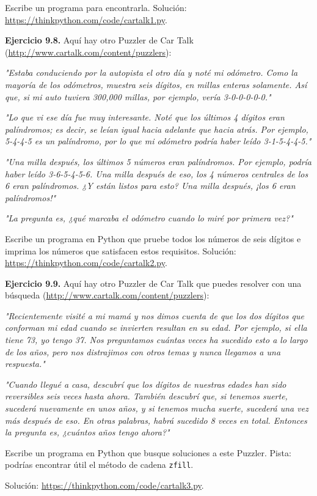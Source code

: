 Escribe un programa para encontrarla. Solución: \url{https://thinkpython.com/code/cartalk1.py}.

\textbf{Ejercicio 9.8.} Aquí hay otro Puzzler de Car Talk (\url{http://www.cartalk.com/content/puzzlers}):

\textit{"Estaba conduciendo por la autopista el otro día y noté mi odómetro. Como la mayoría de los odómetros, muestra seis dígitos, en millas enteras solamente. Así que, si mi auto tuviera 300,000 millas, por ejemplo, vería 3-0-0-0-0-0."}

\textit{"Lo que vi ese día fue muy interesante. Noté que los últimos 4 dígitos eran palíndromos; es decir, se leían igual hacia adelante que hacia atrás. Por ejemplo, 5-4-4-5 es un palíndromo, por lo que mi odómetro podría haber leído 3-1-5-4-4-5."}

\textit{"Una milla después, los últimos 5 números eran palíndromos. Por ejemplo, podría haber leído 3-6-5-4-5-6. Una milla después de eso, los 4 números centrales de los 6 eran palíndromos. ¿Y están listos para esto? Una milla después, ¡los 6 eran palíndromos!"}

\textit{"La pregunta es, ¿qué marcaba el odómetro cuando lo miré por primera vez?"}

Escribe un programa en Python que pruebe todos los números de seis dígitos e imprima los números que satisfacen estos requisitos. Solución: \url{https://thinkpython.com/code/cartalk2.py}.

\textbf{Ejercicio 9.9.} Aquí hay otro Puzzler de Car Talk que puedes resolver con una búsqueda (\url{http://www.cartalk.com/content/puzzlers}):

\textit{"Recientemente visité a mi mamá y nos dimos cuenta de que los dos dígitos que conforman mi edad cuando se invierten resultan en su edad. Por ejemplo, si ella tiene 73, yo tengo 37. Nos preguntamos cuántas veces ha sucedido esto a lo largo de los años, pero nos distrajimos con otros temas y nunca llegamos a una respuesta."}

\textit{"Cuando llegué a casa, descubrí que los dígitos de nuestras edades han sido reversibles seis veces hasta ahora. También descubrí que, si tenemos suerte, sucederá nuevamente en unos años, y si tenemos mucha suerte, sucederá una vez más después de eso. En otras palabras, habrá sucedido 8 veces en total. Entonces la pregunta es, ¿cuántos años tengo ahora?"}

Escribe un programa en Python que busque soluciones a este Puzzler. Pista: podrías encontrar útil el método de cadena \texttt{zfill}.

Solución: \url{https://thinkpython.com/code/cartalk3.py}.